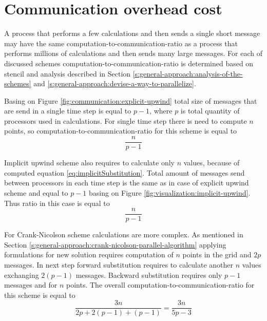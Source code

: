 \section{Communication overhead cost} \label{s:results:cost-of-communication}
	A process that performs a few calculations and then sends a single short message may have the same \gls{computation-to-communication-ratio} as a process that performs millions of calculations and then sends many large messages. For each of discussed schemes \gls{computation-to-communication-ratio} is determined based on \gls{stencil} and analysis described in Section \ref{s:general-approach:analysis-of-the-schemes} and \ref{s:general-approach:devise-a-way-to-parallelize}.
	
	Basing on Figure \ref{fig:communication:explicit-upwind} total size of messages that are send in a single time step is equal to $p-1$, where $p$ is total quantity of processors used in calculations. For single time step there is need to compute $n$ points, so \gls{computation-to-communication-ratio} for this scheme is equal to
	\begin{equation}  \label{eq:ratio:eu}
		\frac{n}{p-1}
	\end{equation}
		
	Implicit upwind scheme also requires to calculate only $n$ values, because of computed equation \eqref{eq:implicitSubstitution}. Total amount of messages send between processors in each time step is the same as in case of explicit upwind scheme and equal to $p-1$ basing on Figure \ref{fig:visualization:implicit-upwind}. Thus ratio in this case is equal to
	\begin{equation}  \label{eq:ratio:iu}
		\frac{n}{p-1}
	\end{equation}
	
	For Crank-Nicolson scheme calculations are more complex. As mentioned in Section \ref{s:general-approach:crank-nicolson-parallel-algorithm} applying formulations for new solution requires computation of $n$ points in the grid and $2p$ messages. In next step forward substitution requires to calculate another $n$ values exchanging $2(p-1)$ messages. Backward substitution requires only $p-1$ messages and for $n$ points. The overall \gls{computation-to-communication-ratio} for this scheme is equal to
	\begin{equation} \label{eq:ratio:cn}
		\frac{3n}{2p + 2(p-1) + (p-1)} = \frac{3n}{5p-3}
	\end{equation}
	
